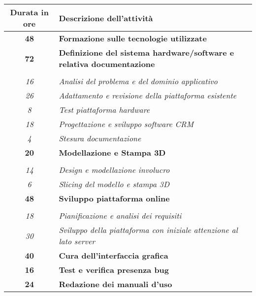 

\begin{tabularx}{\textwidth}{|c|X|}
	\hline
	\textbf{Durata in ore} & \textbf{Descrizione dell'attività} \\\hline
	
	\textbf{48} & \textbf{Formazione sulle tecnologie utilizzate} \\	 
    \hline
    
    \textbf{72} & \textbf{Definizione del sistema hardware/software e relativa documentazione} \\ \hdashline 
    \multirow{3}{0cm}\\ 
    \textit{16} & 
    \textit{Analisi del problema e del dominio applicativo} \\
    \textit{26} & 
    \textit{Adattamento e revisione della piattaforma esistente} \\
    \textit{8} & 
    \textit{Test piattaforma hardware} \\
    \textit{18} & 
    \textit{Progettazione e sviluppo software CRM} \\
    \textit{4} & 
    \textit{Stesura documentazione} \\
    \hline
    
    \textbf{20} & \textbf{Modellazione e Stampa 3D}  \\ \hdashline 
    \multirow{4}{0cm}\\ 
    \textit{14} & 
    \textit{Design e modellazione involucro} \\
    \textit{6} & 
    \textit{Slicing del modello e stampa 3D} \\
    \hline
    
    \textbf{48} & \textbf{Sviluppo piattaforma online}  \\ \hdashline 
    \multirow{4}{0cm}\\ 
    \textit{18} & 
    \textit{Pianificazione e analisi dei requisiti} \\
    \textit{30} & 
    \textit{Sviluppo della piattaforma con iniziale attenzione al lato server} \\
    \hline
    
    \textbf{40} & \textbf{Cura dell'interfaccia grafica}  \\ 
    \hline
    
    \textbf{16} & \textbf{Test e verifica presenza bug}  \\
    \hline
    
	\textbf{24} & \textbf{Redazione dei manuali d'uso}  \\
    \hline    
    

\end{tabularx}
